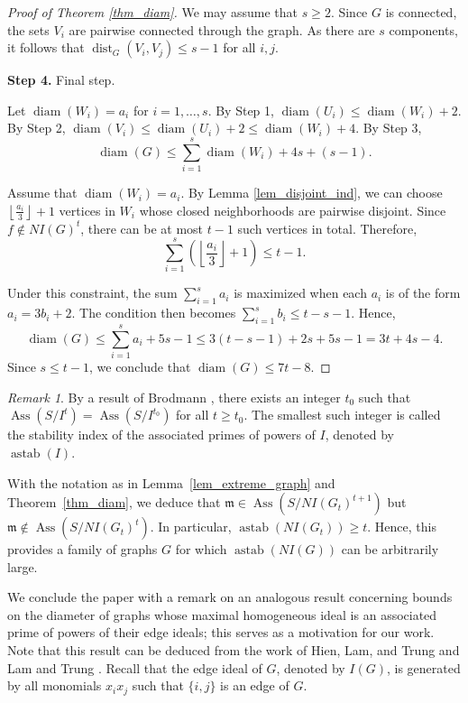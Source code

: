 \documentclass[12pt,reqno,twoside]{amsart}
\newcommand{\mm}{\mathfrak m}
\DeclareMathOperator{\astab}{astab}
\DeclareMathOperator{\diam}{diam}
\DeclareMathOperator{\Ass}{Ass}
\DeclareMathOperator{\dist}{dist}
\theoremstyle{definition}
\theoremstyle{plain}
\theoremstyle{remark}
\newtheorem{rem}[thm]{Remark}
\numberwithin{equation}{section}
\begin{document}
\begin{proof}[Proof of Theorem \ref{thm_diam}]
We may assume that $s \geq 2$. Since $G$ is connected, the sets $V_i$ are pairwise connected through the graph. As there are $s$ components, it follows that $\dist_G(V_i, V_j) \leq s - 1$ for all $i, j$.

\medskip

\noindent \textbf{Step 4.} Final step.

Let $\diam(W_i) = a_i$ for $i = 1, \ldots, s$. By Step 1, $\diam(U_i) \leq \diam(W_i) + 2$. By Step 2, $\diam(V_i) \leq \diam(U_i) + 2 \leq \diam(W_i) + 4$. By Step 3,
\[
\diam(G) \leq \sum_{i=1}^s \diam(W_i) + 4s + (s - 1).
\]

Assume that $\diam(W_i) = a_i$. By Lemma \ref{lem_disjoint_ind}, we can choose $\left\lfloor \frac{a_i}{3} \right\rfloor + 1$ vertices in $W_i$ whose closed neighborhoods are pairwise disjoint. Since $f \notin NI(G)^t$, there can be at most $t - 1$ such vertices in total. Therefore,
\[
\sum_{i=1}^s \left(\left\lfloor \frac{a_i}{3} \right\rfloor + 1\right) \leq t - 1.
\]

Under this constraint, the sum $\sum_{i=1}^s a_i$ is maximized when each $a_i$ is of the form $a_i = 3b_i + 2$. The condition then becomes $\sum_{i=1}^s b_i \leq t - s - 1$. Hence,
\[
\diam(G) \leq \sum_{i=1}^s a_i + 5s - 1 \leq 3(t - s - 1) + 2s + 5s - 1 = 3t + 4s - 4.
\]
Since $s \leq t - 1$, we conclude that $\diam(G) \leq 7t - 8$.
\end{proof}

\begin{rem}
By a result of Brodmann \cite{Br}, there exists an integer $t_0$ such that $\Ass(S/I^t) = \Ass(S/I^{t_0})$ for all $t \ge t_0$. The smallest such integer is called the stability index of the associated primes of powers of $I$, denoted by $\astab(I)$. 

With the notation as in Lemma~\ref{lem_extreme_graph} and Theorem~\ref{thm_diam}, we deduce that $\mm \in \Ass(S/NI(G_t)^{t+1})$ but $\mm \notin \Ass(S/NI(G_t)^t)$. In particular, $\astab(NI(G_t)) \ge t$. Hence, this provides a family of graphs $G$ for which $\astab(NI(G))$ can be arbitrarily large.
\end{rem}

We conclude the paper with a remark on an analogous result concerning bounds on the diameter of graphs whose maximal homogeneous ideal is an associated prime of powers of their edge ideals; this serves as a motivation for our work. Note that this result can be deduced from the work of Hien, Lam, and Trung \cite{HLT} and Lam and Trung \cite{LT}. Recall that the edge ideal of $G$, denoted by $I(G)$, is generated by all monomials $x_i x_j$ such that $\{i,j\}$ is an edge of $G$.
\end{document}
